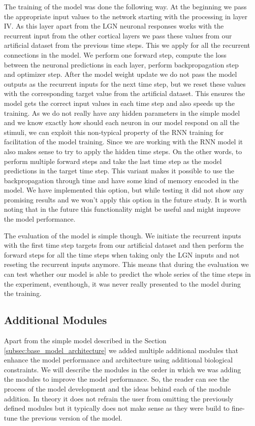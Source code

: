 The training of the model was done the following way. At the beginning we pass the appropriate input values to the network starting with the processing in layer IV. As this layer apart from the LGN neuronal responses works with the recurrent input from the other cortical layers we pass these values from our artificial dataset from the previous time steps. This we apply for all the recurrent connections in the model. We perform one forward step, compute the loss between the neuronal predictions in each layer, perform backpropagation step and optimizer step. After the model weight update we do not pass the model outputs as the recurrent inputs for the next time step, but we reset these values with the corresponding target value from the artificial dataset. This ensures the model gets the correct input values in each time step and also speeds up the training. As we do not really have any hidden parameters in the simple model and we know exactly how should each neuron in our model respond on all the stimuli, we can exploit this non-typical property of the RNN training for facilitation of the model training. Since we are working with the RNN model it also makes sense to try to apply the hidden time steps. On the other words, to perform multiple forward steps and take the last time step as the model predictions in the target time step. This variant makes it possible to use the backpropagation through time and have some kind of memory encoded in the model. We have implemented this option, but while testing it did not show any promising results and we won't apply this option in the future study. It is worth noting that in the future this functionality might be useful and might improve the model performance.

The evaluation of the model is simple though. We initiate the recurrent inputs with the first time step targets from our artificial dataset and then perform the forward steps for all the time steps when taking only the LGN inputs and not reseting the recurrent inputs anymore. This means that during the evaluation we can test whether our model is able to predict the whole series of the time steps in the experiment, eventhough, it was never really presented to the model during the training.

\subsection{Additional Modules}
\label{subsec:additional_modules}
Apart from the simple model described in the Section \ref{subsec:base_model_architecture} we added multiple additional modules that enhance the model performance and architecture using additional biological constraints. We will describe the modules in the order in which we was adding the modules to improve the model performance. So, the reader can see the process of the model development and the ideas behind each of the module addition. In theory it does not refrain the user from omitting the previously defined modules but it typically does not make sense as they were build to fine-tune the previous version of the model.

